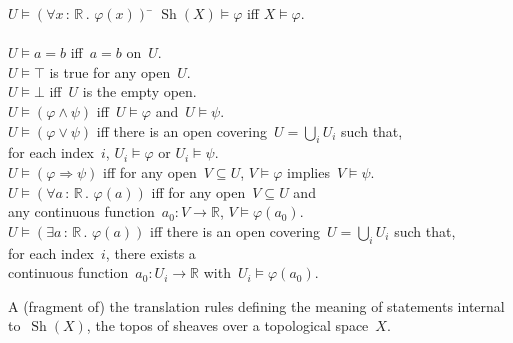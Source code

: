 \documentclass[graybox]{svmult}
\newcommand{\RR}{\mathbb{R}}
\DeclareMathOperator{\Sh}{Sh}
\renewcommand{\_}{\mathpunct{.}\,}
\newcommand{\?}{\,{:}\,}
\begin{document}
\begin{table}
  \centering
  \begin{framed}\begin{tabbing}
    $U \models (\forall x\?\RR\_ \varphi(x))$ \= \kill
    $\Sh(X) \models \varphi$ \> iff $X \models \varphi$. \\\\
    $U \models a = b$ \> iff~$a = b$ on~$U$. \\
    $U \models \top$ \> is true for any open~$U$. \\
    $U \models \bot$ \> iff~$U$ is the empty open. \\
    $U \models (\varphi \wedge \psi)$ \> iff~$U \models \varphi$ and~$U \models \psi$. \\
    $U \models (\varphi \vee \psi)$ \> iff there is an open covering~$U =
    \bigcup_i U_i$ such that, \\ \> \qquad for each index~$i$, $U_i \models \varphi$
    or $U_i \models \psi$. \\
    $U \models (\varphi \Rightarrow \psi)$ \> iff for any open~$V \subseteq U$,
    $V \models \varphi$ implies~$V \models \psi$. \\
    $U \models (\forall a\?\RR\_ \varphi(a))$ \> iff for any open~$V
    \subseteq U$ and \\\>\qquad any continuous function~$a_0 : V \to \RR$, $V \models
    \varphi(a_0)$. \\
    $U \models (\exists a\?\RR\_ \varphi(a))$ \> iff there is an open
    covering~$U = \bigcup_i U_i$ such that, \\ \> \qquad for each index~$i$,
    there exists a \\\>\qquad continuous function~$a_0 : U_i \to \RR$ with~$U_i \models
    \varphi(a_0)$.
  \end{tabbing}\end{framed}
  \bigskip

  \caption{\label{table:sheaf}A (fragment of) the translation rules defining
  the meaning of statements internal to~$\Sh(X)$, the topos of sheaves over a
  topological space~$X$.}
\end{table}
\end{document}
